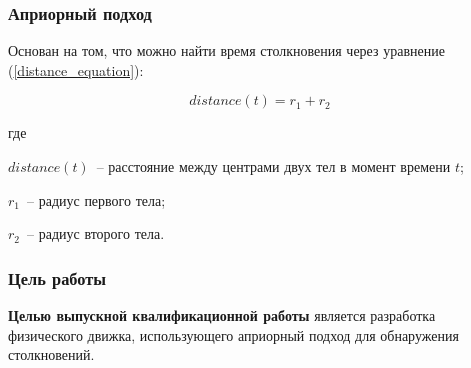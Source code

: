 \documentclass[xetex,aspectratio=43]{beamer}
\newenvironment{Underequation}{
    \small
    \noindent
    где
    \hspace{-1.45ex}
    \setlength{\parindent}{3.5ex}
}{}
\begin{document}





\begin{frame}
    \frametitle{Априорный подход}

    Основан на том, что можно найти время столкновения через уравнение (\ref{distance_equation}):

    \begin{equation}\label{distance_equation}
        distance(t) = r_1 + r_2
    \end{equation}

    \begin{Underequation}
        \(distance(t)\)~-- расстояние между центрами двух тел в момент времени \(t\);

        \(r_1\)~-- радиус первого тела;

        \(r_2\)~-- радиус второго тела.
    \end{Underequation}

\end{frame}

\begin{frame}
    \frametitle{Цель работы}

    \textbf{Целью выпускной квалификационной работы} является
    разработка физического движка, использующего априорный подход для обнаружения столкновений.


\end{frame}

\newcommand\Constraintt{
    \frac{\left|\vec{v_0}\right|}{\left|\vec{a}\right|}
}

\newcommand\Constrainttle{
    t < \Constraintt
}

\newcommand\Constrainttge{
    t \geqslant \Constraintt
}
\end{document}
